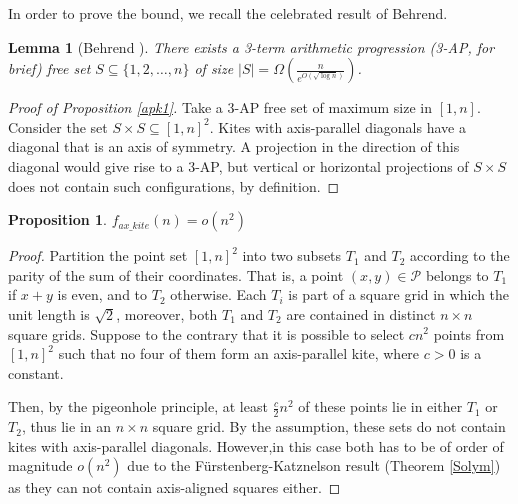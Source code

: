 \documentclass[11pt]{article}
\theoremstyle{plain}
\newtheorem{lemma}[theorem]{\bf Lemma}
\newtheorem{prop}[theorem]{\bf Proposition}
\newcommand\cP{{\mathcal P}}
\begin{document}
	In order to prove the bound, we recall the celebrated result of Behrend.
	
	\begin{lemma}[Behrend \cite{Behrend}]\label{Be}
		There exists a 3-term arithmetic progression (3-AP, for brief) free set $S \subseteq \{1, 2, \dots, n\}$ of size $|S|=\Omega\left(\frac{n}{e^{O(\sqrt{\log{n}})}}\right)$.
	\end{lemma}
	
	\begin{proof}[Proof of Proposition \ref{apk1}] Take a $3$-AP free set of maximum size in $[1,n]$. Consider the set $S\times S\subseteq [1,n]^2$. Kites with axis-parallel diagonals have a diagonal that is an axis of symmetry. A projection in the direction of this diagonal would give rise to a $3$-AP, but vertical or horizontal projections of $S\times S$ does not contain such configurations, by definition.
	\end{proof}
	
	
	\begin{prop}\label{apk2}
		$f_{ax\_kite}(n)=o(n^2)$
	\end{prop}
	
	\begin{proof}
		Partition the point set $[1,n]^2$ into two subsets $T_1$ and $T_2$ according to the parity of the sum of their coordinates. That is, a point $(x, y) \in \cP$ belongs to $T_1$ if $x + y$ is even, and to $T_2$ otherwise. Each $T_i$ is part of a square grid in which the unit length is $\sqrt{2}$, moreover, both $T_1$ and $T_2$  are contained in distinct $n\times n$ square grids. Suppose to the contrary that it is possible to select $cn^2$ points from $[1,n]^2$ such that no four of them form an axis-parallel kite, where $c>0$ is a constant.
		
		Then, by the pigeonhole principle, at least $\frac{c}{2}n^2$ of these points lie in either $T_1$ or $T_2$, thus lie in an $n\times n$ square grid. By the assumption, these sets do not contain kites with axis-parallel diagonals.  However,in this case both has to be of order of magnitude $o(n^2)$ due to the Fürstenberg-Katznelson result (Theorem \ref{Solym}) as they can not contain axis-aligned squares either.
	\end{proof}
	
\end{document}
